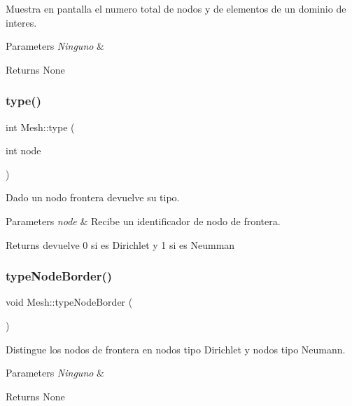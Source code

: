 Muestra en pantalla el numero total de nodos y de elementos de un dominio de interes. 


\begin{DoxyParams}{Parameters}
{\em Ninguno} & \\
\hline
\end{DoxyParams}
\begin{DoxyReturn}{Returns}
None 
\end{DoxyReturn}
\hypertarget{class_mesh_aef283d305e17ab48771999e7835ed294}{}\label{class_mesh_aef283d305e17ab48771999e7835ed294} 
\subsubsection{\texorpdfstring{type()}{type()}}
{\footnotesize\ttfamily int Mesh\+::type (\begin{DoxyParamCaption}\item[{int}]{node }\end{DoxyParamCaption})\hspace{0.3cm}{\ttfamily [inline]}}



Dado un nodo frontera devuelve su tipo. 


\begin{DoxyParams}{Parameters}
{\em node} & Recibe un identificador de nodo de frontera. \\
\hline
\end{DoxyParams}
\begin{DoxyReturn}{Returns}
devuelve 0 si es Dirichlet y 1 si es Neumman 
\end{DoxyReturn}
\hypertarget{class_mesh_a1e306db2532f24a66b8d43cb634afd61}{}\label{class_mesh_a1e306db2532f24a66b8d43cb634afd61} 
\subsubsection{\texorpdfstring{type\+Node\+Border()}{typeNodeBorder()}}
{\footnotesize\ttfamily void Mesh\+::type\+Node\+Border (\begin{DoxyParamCaption}{ }\end{DoxyParamCaption})}



Distingue los nodos de frontera en nodos tipo Dirichlet y nodos tipo Neumann. 


\begin{DoxyParams}{Parameters}
{\em Ninguno} & \\
\hline
\end{DoxyParams}
\begin{DoxyReturn}{Returns}
None 
\end{DoxyReturn}
\hypertarget{class_mesh_adef108df36f29f4880a9233075e04210}{}\label{class_mesh_adef108df36f29f4880a9233075e04210} 
